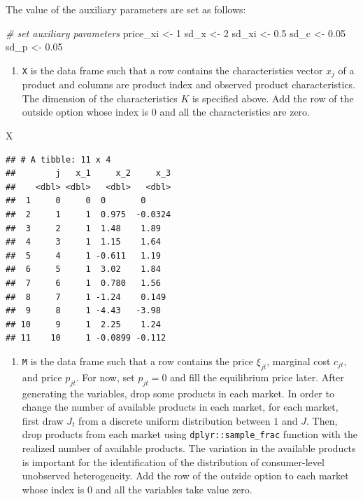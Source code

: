 \documentclass[
]{book}
\newenvironment{Shaded}{\begin{snugshade}}{\end{snugshade}}
\newcommand{\CommentTok}[1]{\textcolor[rgb]{0.56,0.35,0.01}{\textit{#1}}}
\newcommand{\DecValTok}[1]{\textcolor[rgb]{0.00,0.00,0.81}{#1}}
\newcommand{\FloatTok}[1]{\textcolor[rgb]{0.00,0.00,0.81}{#1}}
\newcommand{\NormalTok}[1]{#1}
\newcommand{\OtherTok}[1]{\textcolor[rgb]{0.56,0.35,0.01}{#1}}
\providecommand{\tightlist}{%
  \setlength{\itemsep}{0pt}\setlength{\parskip}{0pt}}
\begin{document}
The value of the auxiliary parameters are set as follows:

\begin{Shaded}
\begin{Highlighting}[]
\CommentTok{\# set auxiliary parameters}
\NormalTok{price\_xi }\OtherTok{\textless{}{-}} \DecValTok{1}
\NormalTok{sd\_x }\OtherTok{\textless{}{-}} \DecValTok{2}
\NormalTok{sd\_xi }\OtherTok{\textless{}{-}} \FloatTok{0.5}
\NormalTok{sd\_c }\OtherTok{\textless{}{-}} \FloatTok{0.05}
\NormalTok{sd\_p }\OtherTok{\textless{}{-}} \FloatTok{0.05}
\end{Highlighting}
\end{Shaded}

\begin{enumerate}
\def\labelenumi{\arabic{enumi}.}
\setcounter{enumi}{1}
\tightlist
\item
  \texttt{X} is the data frame such that a row contains the characteristics vector \(x_{j}\) of a product and columns are product index and observed product characteristics. The dimension of the characteristics \(K\) is specified above. Add the row of the outside option whose index is \(0\) and all the characteristics are zero.
\end{enumerate}

\begin{Shaded}
\begin{Highlighting}[]
\NormalTok{X}
\end{Highlighting}
\end{Shaded}

\begin{verbatim}
## # A tibble: 11 x 4
##        j   x_1     x_2     x_3
##    <dbl> <dbl>   <dbl>   <dbl>
##  1     0     0  0       0     
##  2     1     1  0.975  -0.0324
##  3     2     1  1.48    1.89  
##  4     3     1  1.15    1.64  
##  5     4     1 -0.611   1.19  
##  6     5     1  3.02    1.84  
##  7     6     1  0.780   1.56  
##  8     7     1 -1.24    0.149 
##  9     8     1 -4.43   -3.98  
## 10     9     1  2.25    1.24  
## 11    10     1 -0.0899 -0.112
\end{verbatim}

\begin{enumerate}
\def\labelenumi{\arabic{enumi}.}
\setcounter{enumi}{2}
\tightlist
\item
  \texttt{M} is the data frame such that a row contains the price \(\xi_{jt}\), marginal cost \(c_{jt}\), and price \(p_{jt}\). For now, set \(p_{jt} = 0\) and fill the equilibrium price later. After generating the variables, drop some products in each market. In order to change the number of available products in each market, for each market, first draw \(J_t\) from a discrete uniform distribution between \(1\) and \(J\). Then, drop products from each market using \texttt{dplyr::sample\_frac} function with the realized number of available products. The variation in the available products is important for the identification of the distribution of consumer-level unobserved heterogeneity. Add the row of the outside option to each market whose index is \(0\) and all the variables take value zero.
\end{enumerate}
\end{document}

